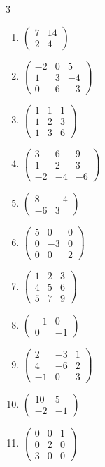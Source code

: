 \begin{multicols}{3}
\begin{enumerate}[label=\arabic*.,  leftmargin=*]
\item $\begin{pmatrix}7&14\\2&4\end{pmatrix}$
\item $\begin{pmatrix}-2&0&5\\1&3&-4\\0&6&-3\end{pmatrix}$
\item $\begin{pmatrix}1&1&1\\1&2&3\\1&3&6\end{pmatrix}$
\item $\begin{pmatrix}3&6&9\\1&2&3\\-2&-4&-6\end{pmatrix}$
\item $\begin{pmatrix}8&-4\\-6&3\end{pmatrix}$
\item $\begin{pmatrix}5&0&0\\0&-3&0\\0&0&2\end{pmatrix}$
\item $\begin{pmatrix}1&2&3\\4&5&6\\5&7&9\end{pmatrix}$
\item $\begin{pmatrix}-1&0\\0&-1\end{pmatrix}$
\item $\begin{pmatrix}2&-3&1\\4&-6&2\\-1&0&3\end{pmatrix}$
\item $\begin{pmatrix}10&5\\-2&-1\end{pmatrix}$
\item $\begin{pmatrix}0&0&1\\0&2&0\\3&0&0\end{pmatrix}$

\end{enumerate}
\end{multicols}
